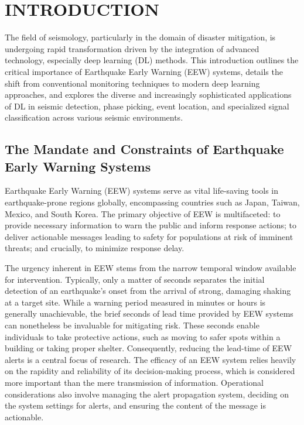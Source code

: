 \documentclass[a4paper,12pt]{report}
\begin{document}
\onehalfspacing


\chapter{INTRODUCTION}
\label{chap:introduction}

The field of seismology, particularly in the domain of disaster mitigation, is undergoing rapid transformation driven by the integration of advanced technology, especially deep learning (DL) methods. This introduction outlines the critical importance of Earthquake Early Warning (EEW) systems, details the shift from conventional monitoring techniques to modern deep learning approaches, and explores the diverse and increasingly sophisticated applications of DL in seismic detection, phase picking, event location, and specialized signal classification across various seismic environments.

\section{The Mandate and Constraints of Earthquake Early Warning Systems}
\label{sec:1.1}

Earthquake Early Warning (EEW) systems serve as vital life-saving tools in earthquake-prone regions globally, encompassing countries such as Japan, Taiwan, Mexico, and South Korea. The primary objective of EEW is multifaceted: to provide necessary information to warn the public and inform response actions; to deliver actionable messages leading to safety for populations at risk of imminent threats; and crucially, to minimize response delay.

The urgency inherent in EEW stems from the narrow temporal window available for intervention. Typically, only a matter of seconds separates the initial detection of an earthquake's onset from the arrival of strong, damaging shaking at a target site. While a warning period measured in minutes or hours is generally unachievable, the brief seconds of lead time provided by EEW systems can nonetheless be invaluable for mitigating risk. These seconds enable individuals to take protective actions, such as moving to safer spots within a building or taking proper shelter. Consequently, reducing the lead-time of EEW alerts is a central focus of research. The efficacy of an EEW system relies heavily on the rapidity and reliability of its decision-making process, which is considered more important than the mere transmission of information. Operational considerations also involve managing the alert propagation system, deciding on the system settings for alerts, and ensuring the content of the message is actionable.
\end{document}
